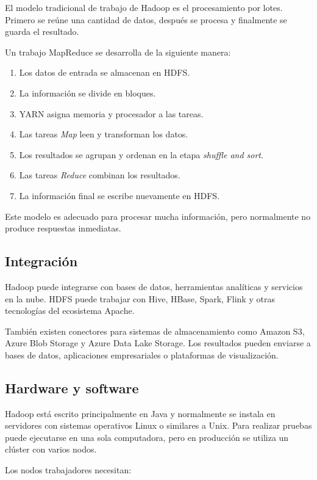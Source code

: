 El modelo tradicional de trabajo de Hadoop es el procesamiento por lotes.
Primero se reúne una cantidad de datos, después se procesa y finalmente se
guarda el resultado.

Un trabajo MapReduce se desarrolla de la siguiente manera:

\begin{enumerate}
    \item Los datos de entrada se almacenan en HDFS.
    \item La información se divide en bloques.
    \item YARN asigna memoria y procesador a las tareas.
    \item Las tareas \textit{Map} leen y transforman los datos.
    \item Los resultados se agrupan y ordenan en la etapa
    \textit{shuffle and sort}.
    \item Las tareas \textit{Reduce} combinan los resultados.
    \item La información final se escribe nuevamente en HDFS.
\end{enumerate}

Este modelo es adecuado para procesar mucha información, pero normalmente no
produce respuestas inmediatas.

\subsection{Integración}

Hadoop puede integrarse con bases de datos, herramientas analíticas y
servicios en la nube. HDFS puede trabajar con Hive, HBase, Spark, Flink y otras
tecnologías del ecosistema Apache.

También existen conectores para sistemas de almacenamiento como Amazon S3,
Azure Blob Storage y Azure Data Lake Storage. Los resultados pueden enviarse a
bases de datos, aplicaciones empresariales o plataformas de visualización.

\subsection{Hardware y software}

Hadoop está escrito principalmente en Java y normalmente se instala en
servidores con sistemas operativos Linux o similares a Unix. Para realizar
pruebas puede ejecutarse en una sola computadora, pero en producción se
utiliza un clúster con varios nodos.

Los nodos trabajadores necesitan:

